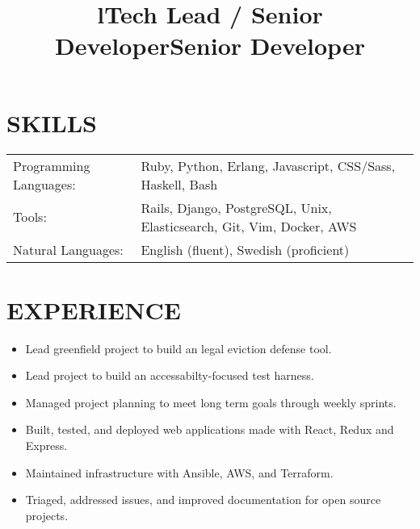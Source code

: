 \documentclass[line]{res}
\title{l}\dates{r}\\
\begin{document}
\begin{resume}

\section{SKILLS}
\begin{tabular}{ l l }
Programming Languages: &
Ruby,
Python,
Erlang,
Javascript,
CSS/Sass,
Haskell,
Bash\\

Tools: &
Rails,
Django,
PostgreSQL,
Unix,
Elasticsearch,
Git,
Vim,
Docker,
AWS\\

Natural Languages: &
English (fluent),
Swedish (proficient)
\end{tabular}

\section {EXPERIENCE}
\vspace {2 pt}

\title{Tech Lead / Senior Developer}
\begin{position}
\noindent
\vspace {-10 pt}
\begin{itemize}

\item Lead greenfield project to build an legal eviction defense tool.
\item Lead project to build an accessabilty-focused test harness.
\item Managed project planning to meet long term goals through weekly sprints.
\item Built, tested, and deployed  web applications made with React, Redux and Express.
\item Maintained infrastructure with Ansible, AWS, and Terraform.
\item Triaged, addressed issues, and improved documentation for open source
  projects.

\end{itemize}
\end{position}

\title{Senior Developer}
\begin{position}
\noindent
\vspace {-10 pt}
\begin{itemize}


\end{itemize}
\end{position}
\end{resume}
\end{document}
